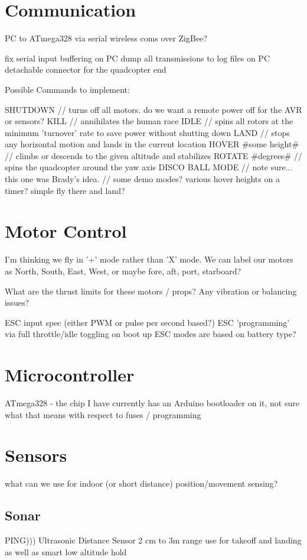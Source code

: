 \documentclass{article}
\begin{document}
\section{Communication}
PC to ATmega328 via serial
wireless coms over ZigBee?

fix serial input buffering on PC
dump all transmissions to log files on PC
detachable connector for the quadcopter end

Possible Commands to implement:

SHUTDOWN // turns off all motors.  do we want a remote power off for the AVR or sensors?
KILL // annihilates the human race
IDLE // spins all rotors at the minimum 'turnover' rate to save power without shutting down
LAND // stops any horizontal motion and lands in the current location
HOVER #some height#  // climbs or descends to the given altitude and stabilizes
ROTATE #degrees#     // spins the quadcopter around the yaw axis
DISCO BALL MODE      // note sure... this one was Brady's idea.
// some demo modes? various hover heights on a timer?  simple fly there and land?

\section{Motor Control}
I'm thinking we fly in '+' mode rather than 'X' mode.  We can label our motors as North, South, East, West, or maybe fore, aft, port, starboard?

What are the thrust limits for these motors / props? Any vibration or balancing issues?


ESC input spec (either PWM or pulse per second based?)
ESC 'programming' via full throttle/idle toggling on boot up
ESC modes are based on battery type?

\section{Microcontroller}
ATmega328 - the chip I have currently has an Arduino bootloader on it, not sure what that means with respect to fuses / programming

\section{Sensors}
what can we use for indoor (or short distance) position/movement sensing?
\subsection{Sonar}
PING))) Ultrasonic Distance Sensor
2 cm to 3m range
use for takeoff and landing as well as smart low altitude hold
\end{document}

